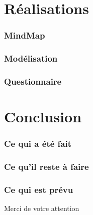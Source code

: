 \documentclass{beamer}
\begin{document}
  \section{Réalisations}
  \begin{frame}
   \frametitle{MindMap}
  \end{frame}
  
  \begin{frame}
   \frametitle{Modélisation}
  \end{frame}
  
  \begin{frame}
   \frametitle{Questionnaire}
  \end{frame}

  \section{Conclusion}
  \begin{frame}
   \frametitle{Ce qui a été fait} 
  \end{frame}
  
  \begin{frame}
   \frametitle{Ce qu'il reste à faire}
  \end{frame}
  
  \begin{frame}
   \frametitle{Ce qui est prévu}
  \end{frame}

  \begin{frame}
    \begin{center}
      Merci de votre attention
    \end{center}
  \end{frame}
\end{document}
